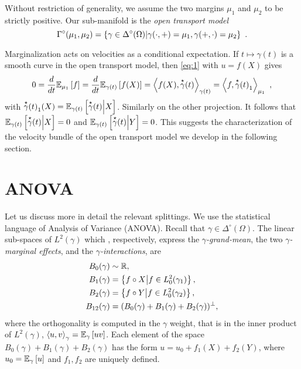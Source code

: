 \documentclass[runningheads]{llncs}
\begin{document}
Without restriction of generality, we assume the two margins $\mu_1$ and $\mu_2$ to be strictly positive. Our sub-manifold is the \emph{open transport model}
\begin{equation*} \Gamma^\circ(\mu_1,\mu_2) = \setof{\gamma \in \Delta^\circ(\Omega)}{\gamma(\cdot,+) = \mu_1, \gamma(+,\cdot) = \mu_2} \ .
\end{equation*}

Marginalization acts on velocities as a conditional expectation. If $t \mapsto \gamma(t)$ is a smooth curve in the open transport model, then \cref{eq:1} with $u = f(X)$ gives \begin{equation*} 0 = \derivby t \expectat {\mu_1} f =  \derivby t \expectat {\gamma(t)} {f(X)} = \scalarat {\gamma(t)}  {f(X)} {\velocity \gamma(t)} = \scalarat {\mu_1}  f {{\velocity \gamma(t)}_1} \ , \end{equation*} with ${\velocity \gamma(t)}_1(X) = \condexpectat {\gamma(t)} {\velocity \gamma(t)} X$. Similarly on the other projection. It follows that $\condexpectat {\gamma(t)} {\velocity \gamma(t)} X = 0$ and $\condexpectat {\gamma(t)} {\velocity \gamma(t)} Y = 0$. This suggests the characterization of the velocity bundle of the open transport model we develop in the following section.

\section{ANOVA}

Let us discuss more in detail the relevant splittings. We use the statistical language of Analysis of Variance (ANOVA). Recall that $\gamma \in \Delta^\circ(\Omega)$. The linear sub-spaces of $L^2(\gamma)$ which , respectively, express the \emph{$\gamma$-grand-mean}, the two \emph{$\gamma$-marginal effects}, and the \emph{$\gamma$-interactions}, are
\begin{equation}\label{eq:ANOVA-spaces} \begin{aligned} B_0(\gamma) &\sim \reals, \\ B_1(\gamma) &= \setof{f\circ X}{f \in L^2_0(\gamma_1)},\\ B_2(\gamma) &= \setof{f\circ Y}{f \in L^2_0(\gamma_2)},\\ B_{12}(\gamma) &= (B_0(\gamma) + B_1(\gamma) + B_2(\gamma))^\perp, \end{aligned} \end{equation}
where the orthogonality is computed in the $\gamma$ weight, that is in the inner product of $L^2(\gamma)$, $\scalarat \gamma u v = \expectat \gamma {uv}$. Each element of the space $B_0(\gamma) + B_1(\gamma) + B_2(\gamma)$ has the form $u = u_0 + f_1(X) + f_2(Y)$, where $u_0 = \expectat \gamma u$ and $f_1,f_2$ are uniquely defined. 
\end{document}
